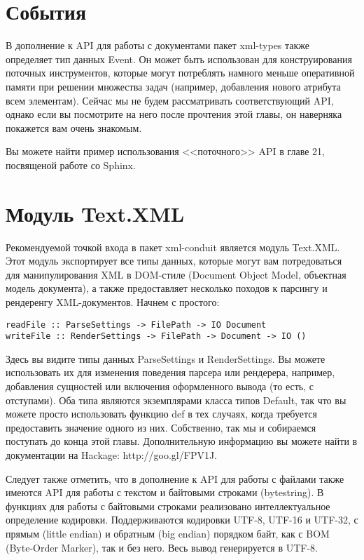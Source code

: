 \section{События} %

В дополнение к API для работы с документами пакет xml-types также определяет тип данных Event. Он может быть использован для конструирования поточных инструментов, которые могут потреблять намного меньше оперативной памяти при решении множества задач (например, добавления нового атрибута всем элементам). Сейчас мы не будем рассматривать соответствующий API, однако если вы посмотрите на него после прочтения этой главы, он наверняка покажется вам очень знакомым.

\begin{remark}
Вы можете найти пример использования <<поточного>> API в главе 21, посвященой работе со Sphinx.
\end{remark}

\section{Модуль Text.XML}

Рекомендуемой точкой входа в пакет xml-conduit является модуль Text.XML. Этот модуль экспортирует все типы данных, которые могут вам потредоваться для манипулирования XML в DOM-стиле (Document Object Model, объектная модель документа), а также предоставляет несколько походов к парсингу и рендеренгу XML-документов. Начнем с простого:

\begin{lstlisting}
readFile :: ParseSettings -> FilePath -> IO Document
writeFile :: RenderSettings -> FilePath -> Document -> IO ()
\end{lstlisting}

Здесь вы видите типы данных ParseSettings и RenderSettings. Вы можете использовать их для изменения поведения парсера или рендерера, например, добавления сущностей или включения оформленного вывода (то есть, с отступами). Оба типа являются экземплярами класса типов Default, так что вы можете просто использовать функцию def в тех случаях, когда требуется предоставить значение одного из них. Собственно, так мы и собираемся поступать до конца этой главы. Дополнительную информацию вы можете найти в документации на Hackage: http://goo.gl/FPV1J.

Следует также отметить, что в дополнение к API для работы с файлами также имеются API для работы с текстом и байтовыми строками (bytestring). В функциях для работы с байтовыми строками реализовано интеллектуальное определение кодировки. Поддерживаются кодировки UTF-8, UTF-16 и UTF-32, с прямым (little endian) и обратным (big endian) порядком байт, как с BOM (Byte-Order Marker), так и без него. Весь вывод генерируется в UTF-8.

